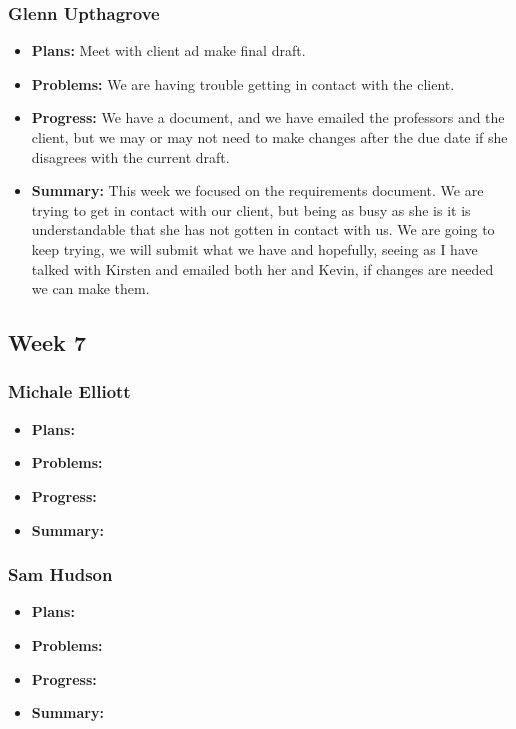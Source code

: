 \documentclass[onecolumn, draftclsnofoot,10pt, compsoc]{IEEEtran}
\begin{document}
\subsubsection{Glenn Upthagrove}
\begin {itemize}
 \item \textbf{Plans: }Meet with client ad make final draft. 
 \item \textbf{Problems: }We are having trouble getting in contact with the client.
 \item \textbf{Progress: }We have a document, and we have emailed the professors and the client, but we may or may not need to make changes after the due date if she disagrees with the current draft.
 \item \textbf{Summary: }This week we focused on the requirements document. We are trying to get in contact with our client, but being as busy as she is it is understandable that she has not gotten in contact with us. We are going to keep trying, we will submit what we have and hopefully, seeing as I have talked with Kirsten and emailed both her and Kevin, if changes are needed we can make them.  
\end {itemize}
\subsection {Week 7}
\subsubsection{Michale Elliott}
\begin {itemize}
 \item \textbf{Plans: }
 \item \textbf{Problems: }
 \item \textbf{Progress: }
 \item \textbf{Summary: }
\end {itemize}
\subsubsection{Sam Hudson}
\begin {itemize}
 \item \textbf{Plans: }
 \item \textbf{Problems: }
 \item \textbf{Progress: }
 \item \textbf{Summary: }
\end {itemize}
\end{document}
